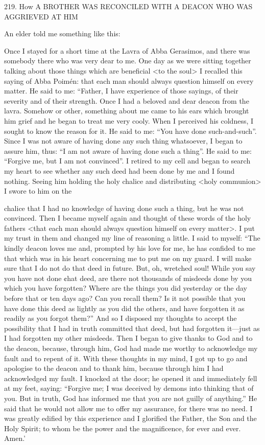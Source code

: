 219. How A BROTHER WAS RECONCILED WITH
A DEACON WHO WAS AGGRIEVED AT HIM

An elder told me something like this:

Once I stayed for a short time at the Lavra of Abba Gerasimos, and
there was somebody there who was very dear to me. One day as we
were sitting together talking about those things which are beneficial
<to the soul> I recalled this saying of Abba Poimén: that each man
should always question himself on every matter. He said to me:
“Father, I have experience of those sayings, of their severity and of
their strength. Once I had a beloved and dear deacon from the
lavra. Somehow or other, something about me came to his ears
which brought him grief and he began to treat me very cooly. When
I perceived his coldness, I sought to know the reason for it. He said
to me: “You have done such-and-such”. Since I was not aware of
having done any such thing whatsoever, I began to assure him, thus:
“I am not aware of having done such a thing”. He said to me:
“Forgive me, but I am not convinced”. I retired to my cell and
began to search my heart to see whether any such deed had been
done by me and I found nothing. Seeing him holding the holy
chalice and distributing <holy communion> I swore to him on the

chalice that I had no knowledge of having done such a thing, but
he was not convinced. Then I became myself again and thought of
these words of the holy fathers <that each man should always
question himself on every matter>. I put my trust in them and
changed my line of reasoning a little. I said to myself: “The kindly
deacon loves me and, prompted by his love for me, he has confided
to me that which was in his heart concerning me to put me on my
guard. I will make sure that I do not do that deed in future. But,
oh, wretched soul! While you say you have not done ¢hat deed, are
there not thousands of misdeeds done by you which you have
forgotten? Where are the things you did yesterday or the day before
that or ten days ago? Can you recall them? Is it not possible that
you have done this deed as lightly as you did the others, and have
forgotten it as readily as you forgot them?” And so I disposed my
thoughts to accept the possibility that I had in truth committed that
deed, but had forgotten it—just as I had forgotten my other
misdeeds. Then I began to give thanks to God and to the deacon,
because, through him, God had made me worthy to acknowledge
my fault and to repent of it. With these thoughts in my mind, I got
up to go and apologise to the deacon and to thank him, because
through him I had acknowledged my fault. I knocked at the door;
he opened it and immediately fell at my feet, saying: “Forgive me;
I was deceived by demons into thinking that of you. But in truth,
God has informed me that you are not guilly of anything.” He said
that he would not allow me to offer my assurance, for there was no
need. I was greatly edified by this experience and I glorified the
Father, the Son and the Holy Spirit; to whom be the power and the
magnificence, for ever and ever. Amen.'

